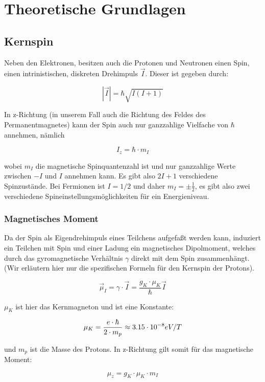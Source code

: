 \section{Theoretische Grundlagen}

\subsection{Kernspin}

Neben den Elektronen, besitzen auch die Protonen und Neutronen einen Spin, einen intrinistischen, diskreten Drehimpuls $\vec I$. Dieser ist gegeben durch:

$$ |\vec I| = \hbar \sqrt{I(I+1)} $$

In z-Richtung (in unserem Fall auch die Richtung des Feldes des Permanentmagnetes) kann der Spin auch nur ganzzahlige Vielfache von $\hbar$ annehmen, nämlich

$$I_z = \hbar\cdot m_I$$

wobei $m_I$ die magnetische Spinquantenzahl ist und nur ganzzahlige Werte zwischen $-I$ und $I$ annehmen kann. Es gibt also $2I+1$ verschiedene Spinzustände. Bei Fermionen ist $I=1/2$ und daher $m_I = \pm\frac{1}{2}$, es gibt also zwei verschiedene Spineinstellungsmöglichkeiten für ein Energieniveau.

\subsubsection{Magnetisches Moment}

Da der Spin als Eigendrehimpuls eines Teilchens aufgefaßt werden kann, induziert ein Teilchen mit Spin und einer Ladung ein magnetisches Dipolmoment, welches durch das gyromagnetische Verhältnis $\gamma$ direkt mit dem Spin zusammenhängt. (Wir erläutern hier nur die spezifischen Formeln für den Kernspin der Protons).

\begin{equation} \vec \mu_I = \gamma\cdot\vec I = \frac{g_K\cdot\mu_K}{\hbar}\vec I \label{gyro}\end{equation}

$\mu_K$ ist hier das Kernmagneton und ist eine Konstante:

$$\mu_K = \frac{e\cdot \hbar}{2\cdot m_p} \approx 3.15\cdot 10^{-8} eV/T$$

und $m_p$ ist die Masse des Protons. In z-Richtung gilt somit für das magnetische Moment:

\begin{equation} \mu_z = g_K \cdot \mu_K \cdot m_I \label{muz} \end{equation}

